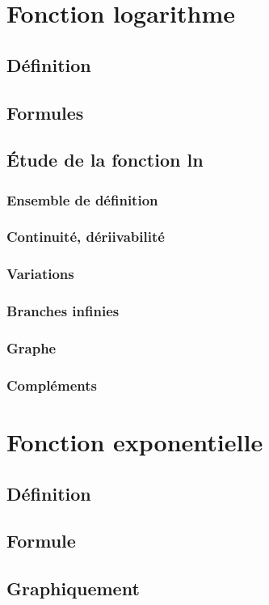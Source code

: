 \documentclass[12pt,a4paper,french]{book}
\begin{document}
	\section{Fonction logarithme}
		\subsection{Définition}
		\subsection{Formules}
		\subsection{Étude de la fonction ln}
			\subsubsection{Ensemble de définition}
			\subsubsection{Continuité, dériivabilité}
			\subsubsection{Variations}
			\subsubsection{Branches infinies}
			\subsubsection{Graphe}
			\subsubsection{Compléments}
	\section{Fonction exponentielle}
		\subsection{Définition}
		\subsection{Formule}
		\subsection{Graphiquement}
\end{document}
